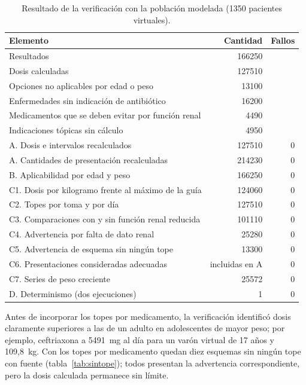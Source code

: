 \documentclass[11pt,a4paper]{article}
\begin{document}
\begin{table}[htbp]
\centering
\caption{Resultado de la verificación con la población modelada (\num{1350} pacientes virtuales).}
\label{tab:exhaustiva}
\small
\begin{tabular}{@{}lrr@{}}
\toprule
Elemento & Cantidad & Fallos \\
\midrule
Resultados & \num{166250} & \\
\quad Dosis calculadas & \num{127510} & \\
\quad Opciones no aplicables por edad o peso & \num{13100} & \\
\quad Enfermedades sin indicación de antibiótico & \num{16200} & \\
\quad Medicamentos que se deben evitar por función renal & \num{4490} & \\
\quad Indicaciones tópicas sin cálculo & \num{4950} & \\
\midrule
A. Dosis e intervalos recalculados & \num{127510} & 0 \\
A. Cantidades de presentación recalculadas & \num{214230} & 0 \\
B. Aplicabilidad por edad y peso & \num{166250} & 0 \\
C1. Dosis por kilogramo frente al máximo de la guía & \num{124060} & 0 \\
C2. Topes por toma y por día & \num{127510} & 0 \\
C3. Comparaciones con y sin función renal reducida & \num{101110} & 0 \\
C4. Advertencia por falta de dato renal & \num{25280} & 0 \\
C5. Advertencia de esquema sin ningún tope & \num{13300} & 0 \\
C6. Presentaciones consideradas adecuadas & incluidas en A & 0 \\
C7. Series de peso creciente & \num{25572} & 0 \\
D. Determinismo (dos ejecuciones) & 1 & 0 \\
\bottomrule
\end{tabular}
\end{table}

Antes de incorporar los topes por medicamento, la verificación identificó dosis claramente superiores a las de un adulto en adolescentes de mayor peso; por ejemplo, ceftriaxona a \num{5491}~mg al día para un varón virtual de 17 años y 109,8~kg. Con los topes por medicamento quedan diez esquemas sin ningún tope con fuente (tabla~\ref{tab:sintope}); todos presentan la advertencia correspondiente, pero la dosis calculada permanece sin límite.
\end{document}
